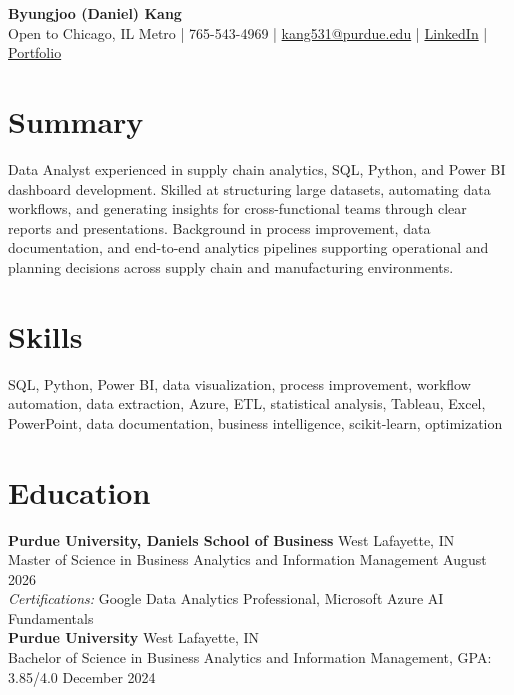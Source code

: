 \documentclass[11pt,a4paper]{article}
\begin{document}
\pagestyle{empty}

\begin{center}
    {\Huge \textbf{Byungjoo (Daniel) Kang}} \\[4pt]
    Open to Chicago, IL Metro | 765-543-4969 | \href{mailto:kang531@purdue.edu}{kang531@purdue.edu} |
    \href{https://www.linkedin.com/in/daniel-byungjoo-kang/}{LinkedIn} | \href{https://daniel-kang-vs.github.io}{Portfolio}
\end{center}

\section*{Summary}
Data Analyst experienced in supply chain analytics, SQL, Python, and Power BI dashboard development. Skilled at structuring large datasets, automating data workflows, and generating insights for cross-functional teams through clear reports and presentations. Background in process improvement, data documentation, and end-to-end analytics pipelines supporting operational and planning decisions across supply chain and manufacturing environments.

\section*{Skills}
SQL, Python, Power BI, data visualization, process improvement, workflow automation, data extraction, Azure, ETL, statistical analysis, Tableau, Excel, PowerPoint, data documentation, business intelligence, scikit-learn, optimization

\section*{Education}
\noindent
\textbf{Purdue University, Daniels School of Business} \hfill West Lafayette, IN \\
Master of Science in Business Analytics and Information Management \hfill August 2026 \\
\textit{Certifications:} Google Data Analytics Professional, Microsoft Azure AI Fundamentals \\[6pt]
\textbf{Purdue University} \hfill West Lafayette, IN \\
Bachelor of Science in Business Analytics and Information Management, GPA: 3.85/4.0 \hfill December 2024
\end{document}
